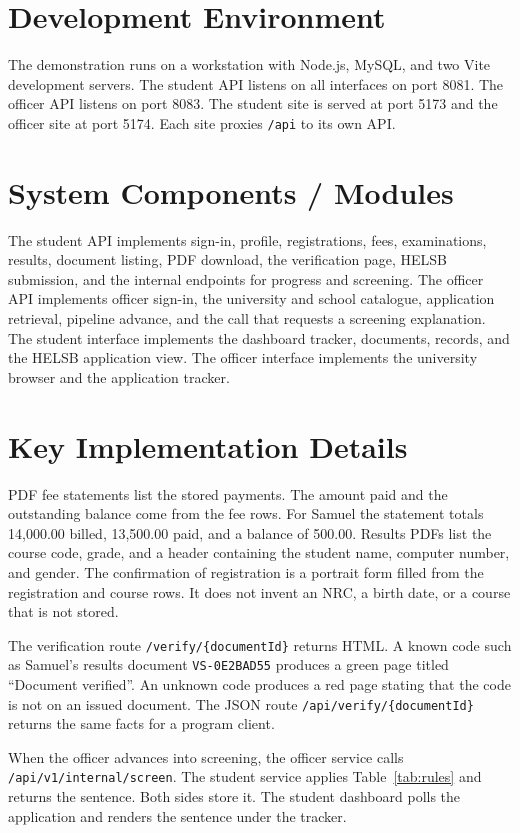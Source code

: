 \documentclass[12pt,a4paper]{report}
\begin{document}
\section{Development Environment}
The demonstration runs on a workstation with Node.js, MySQL, and two Vite development servers. The student API listens on all interfaces on port 8081. The officer API listens on port 8083. The student site is served at port 5173 and the officer site at port 5174. Each site proxies \texttt{/api} to its own API.

\section{System Components / Modules}
The student API implements sign-in, profile, registrations, fees, examinations, results, document listing, PDF download, the verification page, HELSB submission, and the internal endpoints for progress and screening. The officer API implements officer sign-in, the university and school catalogue, application retrieval, pipeline advance, and the call that requests a screening explanation. The student interface implements the dashboard tracker, documents, records, and the HELSB application view. The officer interface implements the university browser and the application tracker.

\section{Key Implementation Details}
PDF fee statements list the stored payments. The amount paid and the outstanding balance come from the fee rows. For Samuel the statement totals 14,000.00 billed, 13,500.00 paid, and a balance of 500.00. Results PDFs list the course code, grade, and a header containing the student name, computer number, and gender. The confirmation of registration is a portrait form filled from the registration and course rows. It does not invent an NRC, a birth date, or a course that is not stored.

The verification route \texttt{/verify/\{documentId\}} returns HTML. A known code such as Samuel's results document \texttt{VS-0E2BAD55} produces a green page titled ``Document verified''. An unknown code produces a red page stating that the code is not on an issued document. The JSON route \texttt{/api/verify/\{documentId\}} returns the same facts for a program client.

When the officer advances into screening, the officer service calls \texttt{/api/v1/internal/screen}. The student service applies Table~\ref{tab:rules} and returns the sentence. Both sides store it. The student dashboard polls the application and renders the sentence under the tracker.
\end{document}
